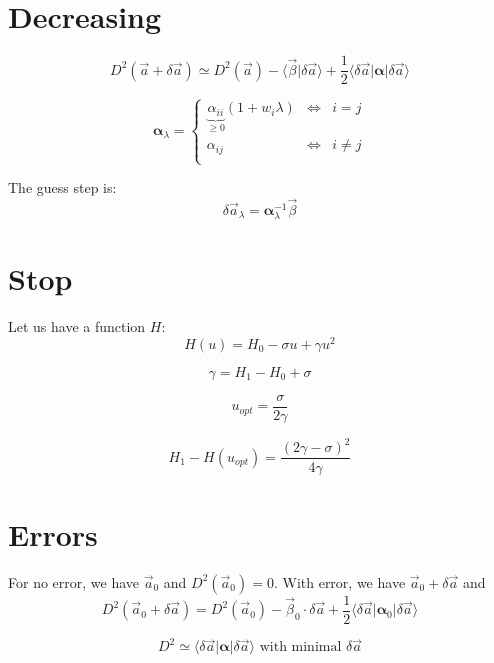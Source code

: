 \documentclass[aps,12pt]{revtex4}
\begin{document}
\section{Decreasing}

\begin{equation}
	 D^2(\vec{a} + \delta \vec{a}) \simeq 
	  D^2(\vec{a}) - \langle \vec{\beta} \vert \delta\vec{a} \rangle 
	  + \dfrac{1}{2} \langle \delta\vec{a} \vert \bm{\alpha}  \vert \delta\vec{a} \rangle 
\end{equation}


\begin{equation}
	\bm{\alpha}_\lambda =
	\left\lbrace
	\begin{array}{ccl}
	\underbrace{\alpha_{ii}}_{\geq0}(1+w_i\lambda) & \iff & i=j\\
	\alpha_{ij} & \iff & i \not= j \\
	\end{array}
	\right.
\end{equation}

The guess step is:
\begin{equation}
	\delta \vec{a}_\lambda = \bm{\alpha}_\lambda^{-1} \vec \beta
\end{equation}

\section{Stop}

Let us have a function $H$:
\begin{equation}
	H(u) = H_0 - \sigma u + \gamma u^2
\end{equation}

\begin{equation}
 \gamma = H_1 - H_0 + \sigma
\end{equation}

\begin{equation}
	u_{opt} = \dfrac{\sigma}{2\gamma}
\end{equation}

\begin{equation}
	H_1 - H(u_{opt}) = \dfrac{(2\gamma-\sigma)^2}{4\gamma}
\end{equation}


\section{Errors}
For no error, we have $\vec{a}_0$ and $D^2(\vec{a}_0)=0$.
With error, we have $\vec{a}_0+\delta\vec{a}$ and 
\begin{equation}
D^2(\vec{a}_0+\delta\vec{a})=D^2(\vec{a}_0) - \vec{\beta}_0 \cdot \delta\vec{a} + \frac{1}{2} 
\langle \delta \vec{a} \vert \bm{\alpha}_0 \vert \delta \vec{a}\rangle
\end{equation}

\begin{equation}
	D^2 \simeq \langle \delta \vec{a} \vert \bm{\alpha} \vert \delta \vec{a}\rangle \text{ with minimal } \delta \vec{a}
\end{equation}
\end{document}
